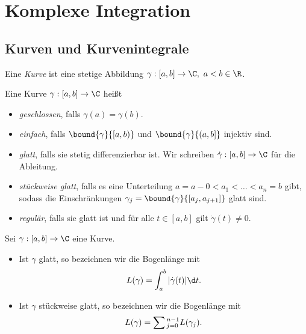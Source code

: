 	
	
	
	
	
\chapter{Komplexe Integration}
	
	\section{Kurven und Kurvenintegrale}
		
		\begin{defn}[Kurve]
			Eine \emph{Kurve} ist eine stetige Abbildung $ \gamma: [a,b] \to \C,\ a<b\in \R $.
		\end{defn}
		\begin{defn}[Kurveneigenschaften]
			Eine Kurve $ \gamma: [a,b] \to \C $ heißt
			\begin{itemize}
				\item \emph{geschlossen}, falls $ \gamma(a) = \gamma(b) $.
				\item \emph{einfach}, falls $ \bound{\gamma}{[a,b)} $ und $ \bound{\gamma}{(a,b]} $ injektiv sind.
				\item \emph{glatt}, falls sie stetig differenzierbar ist. Wir schreiben $ \dot{\gamma} : [a,b] \to \C $ für die Ableitung.
				\item \emph{stückweise glatt}, falls es eine Unterteilung $ a = a-0 < a_1 < \dots < a_n=b $ gibt, sodass die Einschränkungen $ \gamma_j = \bound{\gamma}{\left[a_j,a_{j+1}\right]} $ glatt sind.
				\item \emph{regulär}, falls sie glatt ist und für alle $ t \in [a,b] $ gilt $ \dot{\gamma}(t) \neq 0 $.
			\end{itemize}
		\end{defn}
		\addtocounter{thm}{2}
		\begin{defn}[Bogenlänge]
			Sei $ \gamma: [a,b] \to \C $ eine Kurve.
			\begin{itemize}
				\item Ist $\gamma$ glatt, so bezeichnen wir die Bogenlänge mit 
				$$ L(\gamma) = \int_{a}^{b} |\dot{\gamma}(t)| \d t. $$
				\item Ist $\gamma$ stückweise glatt, so bezeichnen wir die Bogenlänge mit 
				$$ L(\gamma) = \sum\\
				_{j=0}^{n-1} L(\gamma_j). $$
			\end{itemize}
		\end{defn}
		\addtocounter{thm}{2}

